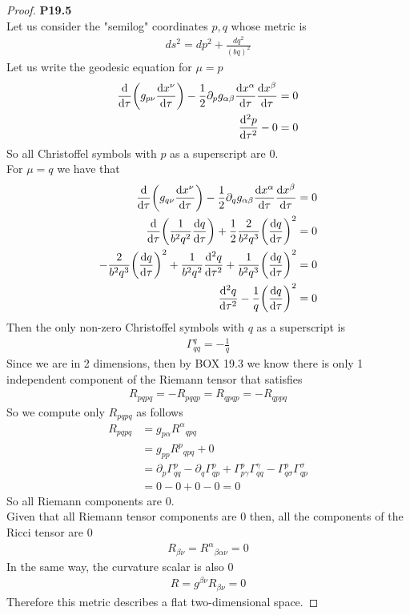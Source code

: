 \documentclass[11pt]{article}
\theoremstyle{definition}
\begin{document}
\cleardoublepage
\begin{proof}{\textbf{P19.5}}\\
Let us consider the "semilog" coordinates $p,q$ whose metric is
\begin{align*}
    ds^2 = dp^2 + \frac{dq^2}{(bq)^2}
\end{align*}
Let us write the geodesic equation for $\mu = p$ 
\begin{align*}
    \dv{\tau}(g_{p\nu}\dv{x^{\nu}}{\tau})
    - \frac{1}{2}\partial_{p}g_{\alpha\beta}\dv{x^\alpha}{\tau}\dv{x^\beta}{\tau}
    &= 0\\
    \dv[2]{p}{\tau} - 0 &= 0
\end{align*}
So all Christoffel symbols with $p$ as a superscript are 0.
\\
For $\mu = q$ we have that
\begin{align*}
    \dv{\tau}(g_{q\nu}\dv{x^{\nu}}{\tau})
    - \frac{1}{2}\partial_{q}g_{\alpha\beta}\dv{x^\alpha}{\tau}\dv{x^\beta}{\tau}
    &= 0\\
    \dv{\tau}(\frac{1}{b^2q^2}\dv{q}{\tau})
    + \frac{1}{2}\frac{2}{b^2q^3}\bigg(\dv{q}{\tau}\bigg)^2
    &= 0\\
    -\frac{2}{b^2q^3}\bigg(\dv{q}{\tau}\bigg)^2
    + \frac{1}{b^2q^2}\dv[2]{q}{\tau}
    + \frac{1}{b^2q^3}\bigg(\dv{q}{\tau}\bigg)^2
    &= 0\\
    \dv[2]{q}{\tau}
    - \frac{1}{q}\bigg(\dv{q}{\tau}\bigg)^2
    &= 0
\end{align*}
Then the only non-zero Christoffel symbols with $q$ as a superscript is
\begin{align*}
    \Gamma^q_{qq} = -\frac{1}{q}
\end{align*}
Since we are in 2 dimensions, then by BOX 19.3 we know there is only 1
independent component of the Riemann tensor that satisfies
\begin{align*}
    R_{pqpq} = -R_{pqqp} = R_{qpqp} = -R_{qppq}
\end{align*}
So we compute only $R_{pqpq}$ as follows
\begin{align*}
    R_{pqpq} &= g_{p\alpha}{R^\alpha}_{qpq}\\
    &= g_{pp}{R^p}_{qpq} + 0\\
    &= \partial_p\Gamma^p_{qq} - \partial_q\Gamma^p_{qp}
    + \Gamma^p_{p\gamma} \Gamma^\gamma_{qq}
    - \Gamma^p_{q\sigma} \Gamma^\sigma_{qp}\\
    &= 0 - 0 + 0 - 0 = 0
\end{align*}
So all Riemann components are 0.\\
Given that all Riemann tensor components are 0 then, all the components of
the Ricci tensor are 0
\begin{align*}
    R_{\beta\nu} = {R^\alpha}_{\beta\alpha\nu} = 0
\end{align*}
In the same way, the curvature scalar is also 0
\begin{align*}
    R = g^{\beta\nu}R_{\beta\nu} = 0
\end{align*}
Therefore this metric describes a flat two-dimensional space.
\end{proof}
\end{document}
